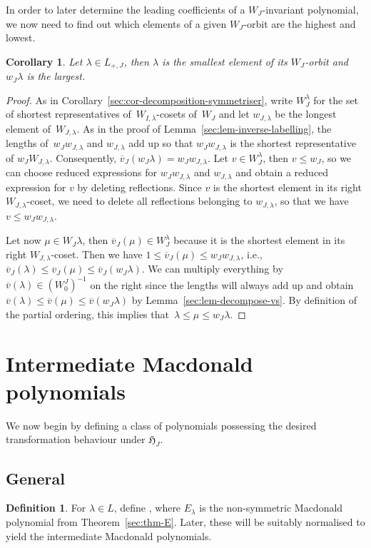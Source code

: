 \documentclass[10pt,a4paper]{amsart}
\newtheorem{Corollary}[Theorem]{Corollary}
\theoremstyle{definition}
\newtheorem{Definition}[Theorem]{Definition}
\numberwithin{equation}{section}
\begin{document}
In order to later determine the leading coefficients of a $W_J$-invariant
polynomial, we now need to find out
which elements of a given $W_J$-orbit are the highest and lowest.
\begin{Corollary}
 Let $\lambda\in L_{+,J}$, then $\lambda$ is the smallest element of its $W_J$-orbit and
 $w_J\lambda$ is the largest.
\end{Corollary}
\begin{proof}
 As in Corollary~\ref{sec:cor-decomposition-symmetriser}, write
 $W_J^\lambda$ for the set of shortest representatives
 of~$W_{I,\lambda}$-cosets of~$W_J$ and let $w_{J,\lambda}$ be the longest element of~$W_{J,\lambda}$. As in the proof of Lemma~\ref{sec:lem-inverse-labelling}, the lengths of~$w_Jw_{J,\lambda}$ and
 $w_{J,\lambda}$ add up so that $w_Jw_{J,\lambda}$ is the shortest representative of $w_JW_{J,\lambda}$. Consequently, $\overline{v}_J(w_J\lambda) = w_Jw_{J,\lambda}$. Let
 $v\in W_J^\lambda$, then $v\le w_J$, so we can choose reduced expressions for $w_Jw_{J,\lambda}$ and $w_{J,\lambda}$ and
 obtain a reduced expression for $v$ by deleting reflections. Since $v$ is the shortest element in its
 right $W_{J,\lambda}$-coset, we need to delete all reflections belonging to $w_{J,\lambda}$, so that
 we have $v\le w_J w_{J,\lambda}$.

 Let now $\mu\in W_J\lambda$, then $\overline{v}_J(\mu)\in W_J^\lambda$ because it is the shortest element in its
 right $W_{J,\lambda}$-coset. Then we have $1\le \overline{v}_J(\mu)\le w_Jw_{J,\lambda}$, i.e.,
$
 \overline{v}_J(\lambda)\le \overline{v}_J(\mu) \le \overline{v}_J(w_J\lambda)$.
 We can multiply everything by $\overline{v}(\lambda)\in (W_0^J)^{-1}$ on the right since the lengths will always add up and
 obtain~${
 \overline{v}(\lambda)\le\overline{v}(\mu)\le\overline{v}(w_J\lambda)}
$
 by Lemma~\ref{sec:lem-decompose-vs}. By definition of the partial ordering, this implies that~${\lambda\le\mu\le w_J\lambda}$.
\end{proof}

\section{Intermediate Macdonald polynomials}\label{sec:poly}
We now begin by defining a class of polynomials possessing the desired
transformation behaviour under $\mathfrak{H}_J$.

\subsection{General}
\begin{Definition}
 For $\lambda\in L$, define , where $E_\lambda$ is the non-symmetric Macdonald polynomial from
 Theorem~\ref{sec:thm-E}.
 Later, these will be suitably normalised to yield the intermediate Macdonald polynomials.
\end{Definition}
\end{document}
